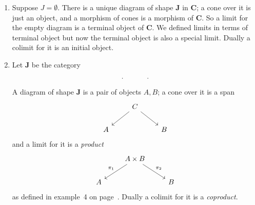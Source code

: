 \documentclass[a4paper]{article}
\renewcommand{\c}[1]{\mathbf{#1}}
\begin{document}
\begin{eg}\leavevmode
  \begin{enumerate}
  \item Suppose \(J = \emptyset\). There is a unique diagram of shape \(\c J\) in \(\c C\); a cone over it is just an object, and a morphism of cones is a morphism of \(\c C\). So a limit for the empty diagram is a terminal object of \(\c C\). We defined limits in terms of terminal object but now the terminal object is also a special limit. Dually a colimit for it is an initial object.
  \item Let \(\c J\) be the category
    \[
      \begin{tikzcd}
        \cdot & \cdot
      \end{tikzcd}
    \]
    A diagram of shape \(\c J\) is a pair of objects \(A, B\); a cone over it is a span
    \[
      \begin{tikzcd}
        & C \ar[dl] \ar[dr] \\
        A & & B
      \end{tikzcd}
    \]
    and a limit for it is a \emph{product}
    \[
      \begin{tikzcd}
        & A \times B \ar[dl, "\pi_1"'] \ar[dr, "\pi_2"] \\
        A & & B
      \end{tikzcd}
    \]
    as defined in example~4 on page~\pageref{eg:representable functor}. Dually a colimit for it is a \emph{coproduct}.


\end{enumerate}
\end{eg}
\end{document}
